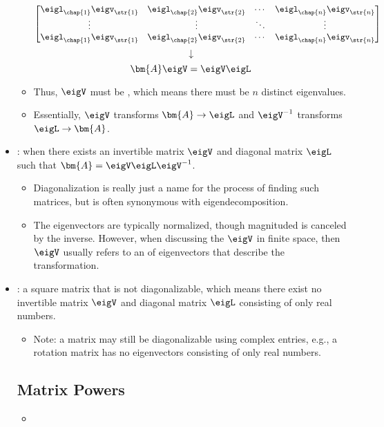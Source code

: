 \begin{itemize}
\begin{itemize}
\[\begin{bmatrix}
    \eigl_{\chap{1}} \eigv_{\str{1}} & \eigl_\chap{2} \eigv_\str{2} & \cdots & \eigl_\chap{n} \eigv_\str{n} \\
    \vdots & \vdots & \ddots & \vdots \\
    \eigl_{\chap{1}} \eigv_{\str{1}} & \eigl_\chap{2} \eigv_\str{2} & \cdots & \eigl_\chap{n} \eigv_\str{n}
    \end{bmatrix}
    \]%
    \[%
    \downarrow
    \]%
    \[%
    \bm{A}\eigV = \eigV \eigL 
    \]%
    \item Thus, \(\eigV \) must be \hyperref[Matrix Inverse]{}, which means there must be \(n\) distinct eigenvalues. 
    \item Essentially, \(\eigV \) transforms \(\bm{A}\to \eigL\) and \(\eigV ^{-1}\) transforms \(\eigL \to \bm{A}\).
  \end{itemize}
  \item {}: when there exists an invertible matrix \(\eigV\) and diagonal matrix \(\eigL\) such that \(\bm{A} = \eigV \eigL \eigV ^{-1}\).
    \begin{itemize}
      \item Diagonalization is really just a name for the process of finding such matrices, but is often synonymous with eigendecomposition.
      \item The eigenvectors are typically normalized, though magnituded is canceled by the inverse. However, when discussing the \(\eigV\) in finite space, then \(\eigV \) usually refers to an \hyperref[Basis]{} of eigenvectors that describe the transformation.
    \end{itemize}
  \item {}: a square matrix that is not diagonalizable, which means there exist no invertible matrix \(\eigV\) and diagonal matrix \(\eigL \) consisting of only real numbers.
    \begin{itemize}
      \item Note: a matrix may still be diagonalizable using complex entries, e.g., a rotation matrix has no eigenvectors consisting of only real numbers.
    \end{itemize}
  \subsection{Matrix Powers}\label{Matrix Powers}
  \begin{itemize}
    \item 
  \end{itemize}
  
\end{itemize}

